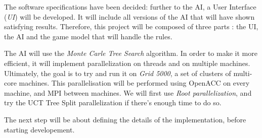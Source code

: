 The software specifications have been decided: further to the AI, a User Interface (\emph{UI}) will be developed.
It will include all versions of the AI that will have shown satisfying results.
Therefore, this project will be composed of three parts : the UI, the AI and the game model that will handle the rules.

The AI will use the \emph{Monte Carle Tree Search} algorithm.
In order to make it more efficient, it will implement parallelization on threads and on multiple machines.
Ultimately, the goal is to try and run it on \emph{Grid 5000}, a set of clusters of multi-core machines.
This parallelisation will be performed using OpenACC on every machine, and MPI between machines.
We will first use \emph{Root parallelization}, and try the UCT Tree Split parallelization if there's enough time to do so.

The next step will be about defining the details of the implementation, before starting developement.